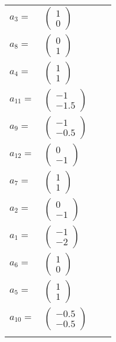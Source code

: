 \documentclass[1p]{elsarticle_modified}
\theoremstyle{definition}
\begin{document}
\begin{tabular}{m{7pt} m{180pt} m{7pt} m{180pt} }
\flushright $a_{3}=$&$\begin{pmatrix}1\\0\end{pmatrix}$ \\
\flushright $a_{8}=$&$\begin{pmatrix}0\\1\end{pmatrix}$ \\
\flushright $a_{4}=$&$\begin{pmatrix}1\\1\end{pmatrix}$ \\
\flushright $a_{11}=$&$\begin{pmatrix}-1\\-1.5\end{pmatrix}$ \\
\flushright $a_{9}=$&$\begin{pmatrix}-1\\-0.5\end{pmatrix}$ \\
\flushright $a_{12}=$&$\begin{pmatrix}0\\-1\end{pmatrix}$ \\
\flushright $a_{7}=$&$\begin{pmatrix}1\\1\end{pmatrix}$ \\
\flushright $a_{2}=$&$\begin{pmatrix}0\\-1\end{pmatrix}$ \\
\flushright $a_{1}=$&$\begin{pmatrix}-1\\-2\end{pmatrix}$ \\
\flushright $a_{6}=$&$\begin{pmatrix}1\\0\end{pmatrix}$ \\
\flushright $a_{5}=$&$\begin{pmatrix}1\\1\end{pmatrix}$ \\
\flushright $a_{10}=$&$\begin{pmatrix}-0.5\\-0.5\end{pmatrix}$\\&\end{tabular}
\end{document}
